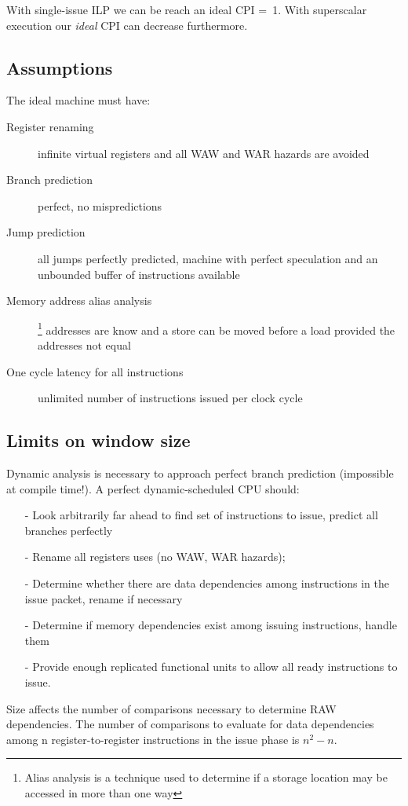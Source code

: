 With single-issue ILP we can be reach an ideal CPI =~1.
With superscalar execution our \textit{ideal} CPI can decrease furthermore.

\subsection{Assumptions}\label{subsec:assumptions}
The ideal machine must have:
\begin{description}
    \item[Register renaming] infinite virtual registers and all WAW and WAR hazards are avoided
    \item[Branch prediction] perfect, no mispredictions
    \item[Jump prediction] all jumps perfectly predicted, machine with perfect speculation and an unbounded buffer of
    instructions available
    \item[Memory address alias analysis]\footnote{Alias analysis is a technique used to determine if a storage location may be accessed in more than one way} addresses are know and a store can be moved before a load provided the 
    addresses not equal 
    \item[One cycle latency for all instructions] unlimited number of instructions issued per clock cycle
\end{description}

\subsection{Limits on window size}\label{subsec:limits-on-window-size}
Dynamic analysis is necessary to approach
perfect branch prediction (impossible at compile
time!).
A perfect dynamic-scheduled CPU should:
\begin{itemize}[noitemsep]
    \item[-] Look arbitrarily far ahead to find set of instructions to
    issue, predict all branches perfectly
    \item[-] Rename all registers uses (no WAW, WAR hazards);
    \item[-] Determine whether there are data dependencies
    among instructions in the issue packet, rename if
    necessary
    \item[-] Determine if memory dependencies exist among
    issuing instructions, handle them
    \item[-] Provide enough replicated functional units to allow all
    ready instructions to issue.
\end{itemize}
Size affects the number of comparisons necessary to determine
RAW dependencies.
The number of comparisons to evaluate for data dependencies among n register-to-register
instructions in the issue phase is \(n^2 - n\).
